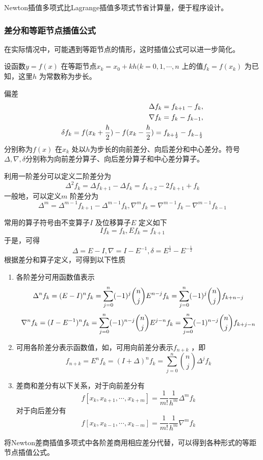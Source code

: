 \documentclass[a4paper]{article}
\begin{document}
Newton插值多项式比Lagrange插值多项式节省计算量，便于程序设计。
\subsubsection{差分和等距节点插值公式 }
在实际情况中，可能遇到等距节点的情形，这时插值公式可以进一步简化。

设函数$y=f(x)$ 在等距节点$x_{k} = x_0 + kh (k=0,1,\cdots,n$ 上的值$f_k = f(x_{k})$ 为已知，这里$h$ 为常数称为步长。
\begin{definition}
偏差
\[
	\begin{aligned}
		\Delta f_k = f_{k+1} - f_k, \\
		\nabla f_k = f_k - f_{k-1}, \\
		\delta f_k = f(x_{k} + \frac{h}{2}) - f(x_{k} - \frac{h}{2}) = f_{k+\frac{1}{2}} - f_{k-\frac{1}{2}}
	\end{aligned} \notag
\] 
分别称为$f(x)$ 在$x_{k}$ 处以$h$为步长的向前差分、向后差分和中心差分。符号$\Delta, \nabla, \delta$分别称为向前差分算子、向后差分算子和中心差分算子。
\end{definition}
利用一阶差分可以定义二阶差分为
\[
	\Delta^2 f_k = \Delta f_{k+1} - \Delta f_k = f_{k+2} - 2 f_{k+1} + f_k
\] 
一般地，可以定义$m$ 阶差分为
\[
	\Delta^{m} = \Delta^{m-1}f_{k+1} - \Delta^{m-1}f_k, \nabla ^{m}f_k = \nabla ^{m-1}f_k - \nabla ^{m-1}f_{k-1}
\] 

常用的算子符号由不变算子$I$ 及位移算子$E$ 定义如下
\[
	I f_k = f_k, E f_k = f_{k+1}
\] 
于是，可得
\[
\Delta = E - I, \nabla = I - E^{-1}, \delta = E^{\frac{1}{2}} - E^{-\frac{1}{2}}
\] 
根据差分和算子定义，可得到以下性质
\begin{enumerate}
	\item 各阶差分可用函数值表示
		\[
			\Delta ^{n} f_k = (E-I)^{n} f_k = \sum_{j=0}^{n} (-1)^{j} {n \choose j} E^{n-j} f_k = \sum_{j=0}^{n} (-1)^{j} {n \choose j} f_{k+n-j} \\
		\] 
		\[
			\nabla^{n} f_k = (I-E^{-1})^{n} f_k = \sum_{j=0}^{n} (-1)^{n-j} {n \choose j} E^{j-n} f_k = \sum_{j=0}^{n} (-1)^{n-j} {n \choose j} f_{k+j-n} \\
		\] 
	\item 可用各阶差分表示函数值，如，可用向前差分表示$f_{n+k}$ ，即
		\[
			f_{n+k} = E^{n} f_k = (I + \Delta)^{n} f_k = \sum_{j=0}^{n} {n \choose j} \Delta^{j} f_k
		\] 
	\item 差商和差分有以下关系，对于向前差分有
		\[
			f[x_k, x_{k+1},\cdots,x_{k+m}] = \frac{1}{m!} \frac{1}{h^m} \Delta^{m} f_k \tag{1.4.6} \label{eq:1.4.6}
		\] 
		对于向后差分有
		\[
			f[x_k, x_{k-1},\cdots,x_{k-m}] = \frac{1}{m!} \frac{1}{h^m} \nabla ^{m} f_k \tag{1.4.7} \label{eq:1.4.7}
		\] 
\end{enumerate}
将Newton差商插值多项式中各阶差商用相应差分代替，可以得到各种形式的等距节点插值公式。
\end{document}
